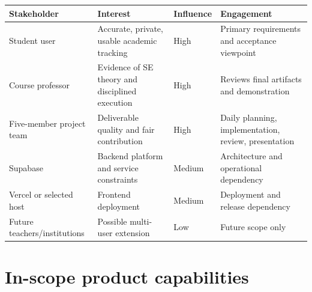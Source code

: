 \documentclass[
  10pt,
  a4paper,
  oneside]{report}
\newcounter{none} %
\begin{document}
{\def\LTcaptype{none} %
\begin{longtable}[]{@{}
  >{\raggedright\arraybackslash}p{}
  >{\raggedright\arraybackslash}p{}
  >{\raggedleft\arraybackslash}p{}
  >{\raggedright\arraybackslash}p{}@{}}
\toprule\noalign{}
\begin{minipage}[b]{\linewidth}\raggedright
Stakeholder
\end{minipage} & \begin{minipage}[b]{\linewidth}\raggedright
Interest
\end{minipage} & \begin{minipage}[b]{\linewidth}\raggedleft
Influence
\end{minipage} & \begin{minipage}[b]{\linewidth}\raggedright
Engagement
\end{minipage} \\
\midrule\noalign{}
\endhead
\bottomrule\noalign{}
\endlastfoot
Student user & Accurate, private, usable academic tracking & High &
Primary requirements and acceptance viewpoint \\
Course professor & Evidence of SE theory and disciplined execution &
High & Reviews final artifacts and demonstration \\
Five-member project team & Deliverable quality and fair contribution &
High & Daily planning, implementation, review, presentation \\
Supabase & Backend platform and service constraints & Medium &
Architecture and operational dependency \\
Vercel or selected host & Frontend deployment & Medium & Deployment and
release dependency \\
Future teachers/institutions & Possible multi-user extension & Low &
Future scope only \\
\end{longtable}
}

\section{In-scope product
capabilities}\label{45-in-scope-product-capabilities}
\end{document}
